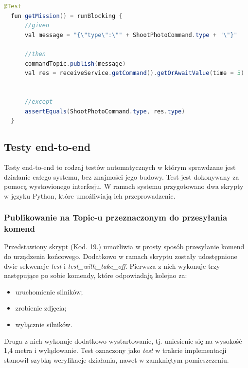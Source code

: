 \begin{lstlisting}[language=Java, caption=Test pobierania komend przez \textit{ReceiveService}]
  @Test
  fun getMission() = runBlocking {
      //given
      val message = "{\"type\":\"" + ShootPhotoCommand.type + "\"}"

      //then
      commandTopic.publish(message)
      val res = receiveService.getCommand().getOrAwaitValue(time = 5)


      //except
      assertEquals(ShootPhotoCommand.type, res.type)
  }
\end{lstlisting}

\subsection{Testy end-to-end}

Testy end-to-end to rodzaj testów automatycznych w którym sprawdzane jest działanie całego systemu, bez znajmości jego budowy. Test jest dokonywany za pomocą wystawionego interfesju. W ramach systemu przygotowano dwa skrypty w języku Python, które umożliwiają ich przeprowadzenie. 

\subsubsection{Publikowanie na Topic-u przeznaczonym do przesyłania komend} 

Przedstawiony skrypt (Kod. 19.) umożliwia w prosty sposób przesyłanie komend do urządzenia końcowego. Dodatkowo w ramach skryptu zostały udostępnione dwie sekwencje \textit{test} i \textit{test\_with\_take\_off}. Pierwsza z nich wykonuje trzy następujące po sobie komendy, które odpowiadają kolejno za:
\begin{itemize}
  \item uruchomienie silników;
  \item zrobienie zdjęcia;
  \item wyłącznie silników.
\end{itemize}
Druga z nich wykonuje dodatkowo wystartowanie, tj. uniesienie się na wysokość 1,4 metra i wylądowanie. Test oznaczony jako \textit{test} w trakcie implementacji stanowił szybką weryfikacje działania, nawet w zamkniętym pomieszczeniu.

